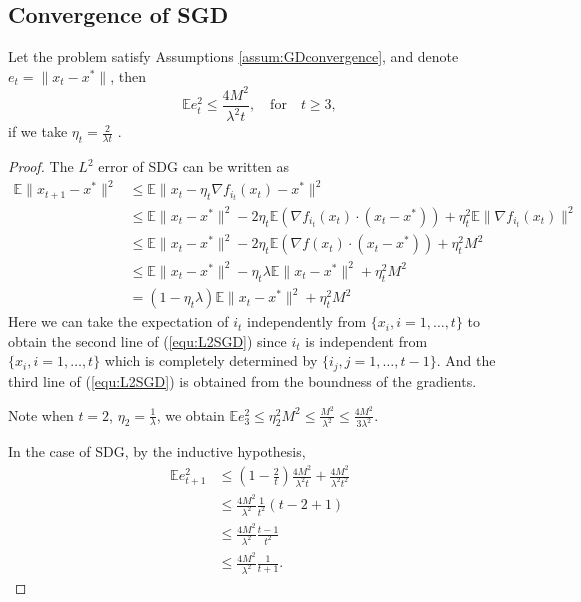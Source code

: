 \subsection{Convergence of SGD}
\begin{theorem}Let the problem satisfy Assumptions \ref{assum:GDconvergence}, and denote $e_t = \|x_t - x^*\|$,
then %
\begin{equation}
\mathbb{E}e_{t}^2 \le \frac{4M^2}{\lambda^2 t}, \quad\text{for} \quad t \ge 3,
\end{equation}
if we take $\eta_t = \frac{2}{\lambda t}$ .
\end{theorem}
\begin{proof}
The $L^2$ error of SDG can be written as
\begin{equation}
      \label{equ:L2SGD}
      \begin{split}
            \mathbb{E} \|x_{t+1} - x^*\|^2 &\le \mathbb{E}\| x_{t} - \eta_t \nabla f_{i_t}(x_t) - x^* \|^2 \\
            &\le \mathbb{E} \|x_t - x^*\|^2 
            - 2 \eta_t \mathbb{E} (\nabla f_{i_t}(x_t) \cdot (x_t - x^*)) 
            + \eta_t^2 \mathbb{E} \|\nabla f_{i_t}(x_t)\|^2 \\
            & \le \mathbb{E} \|x_t - x^*\|^2 - 2 \eta_t \mathbb{E} (\nabla f (x_t) \cdot (x_t - x^*))
            + \eta_t^2 M^2 \\
            & \le \mathbb{E} \|x_t - x^*\|^2 -  \eta_t \lambda \mathbb{E} \|x_t - x^*\|^2 + \eta_t^2 M^2 \\
            & = (1 - \eta_t\lambda) \mathbb{E} \|x_t - x^*\|^2 + \eta_t^2 M^2
      \end{split}
\end{equation}
Here we can take the expectation of $i_t$ independently from $\{x_i, i = 1,\ldots,t\}$
to obtain the second line of (\ref{equ:L2SGD}) since $i_t$ is independent from 
$\{x_i, i = 1,\ldots,t\}$ which is completely determined by $\{i_j, j = 1,\ldots,t - 1\}$.
And the third line of (\ref{equ:L2SGD}) is obtained from the boundness of the gradients.

Note when $t=2$, $\eta_2 = \frac{1}{ \lambda }$, we obtain $ \mathbb{E}e_{3}^2 \le\eta_2^2 M^2\le \frac{M^2}{\lambda^2}\le \frac{4M^2}{3\lambda^2}$.

In the case of SDG, by the inductive hypothesis, 
\begin{equation}
      \begin{split}
            \mathbb{E}e_{t+1}^2 & \le  (1 - \frac{2}{t}) \frac{4M^2}{\lambda^2 t} + \frac{4M^2}{\lambda^2 t^2} \\
            & \le \frac{4M^2}{\lambda^2} \frac{1}{t^2}(t-2+1) \\
            & \le \frac{4M^2}{\lambda^2} \frac{t-1}{t^2} \\
            & \le \frac{4M^2}{\lambda^2} \frac{1}{t+1}.
      \end{split}
\end{equation}
\end{proof}


